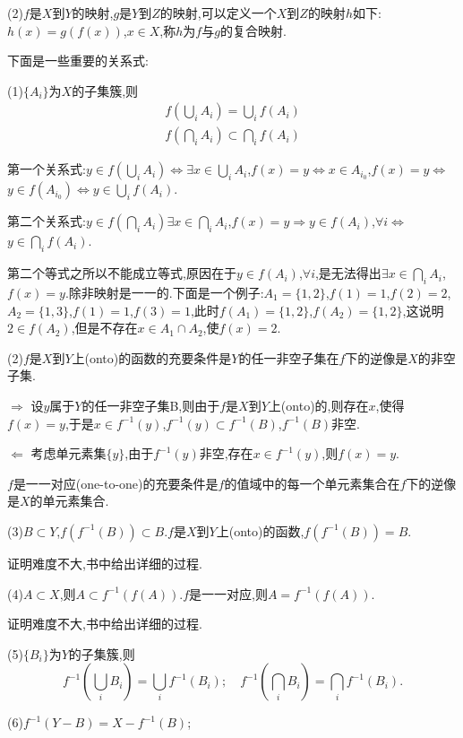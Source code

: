 \documentclass[12pt,a4paper,openany]{book}
\begin{document}
(2)$f$是$X$到$Y$的映射,$g$是$Y$到$Z$的映射,可以定义一个$X$到$Z$的映射$h$如下:$h(x)=g(f(x))$,$x \in X$,称$h$为$f$与$g$的复合映射.

下面是一些重要的关系式:

(1)$\{A_i\}$为$X$的子集簇,则
\begin{gather*}
f(\bigcup_{i}{A_i}) = \bigcup_{i}{f(A_i)} \\
f(\bigcap_{i}{A_i}) \subset \bigcap_{i}{f(A_i)}
\end{gather*}

第一个关系式:$y \in f(\bigcup_{i}{A_i})$$\Leftrightarrow$$\exists x \in \bigcup_{i}{A_i}$,$f(x)=y$$\Leftrightarrow$$x \in A_{i_0}$,$f(x)=y$$\Leftrightarrow$$y \in f(A_{i_0})$$\Leftrightarrow$$y \in \bigcup_{i}{f(A_i)}$.

第二个关系式:$y \in f(\bigcap_{i}{A_i})$$\exists x \in \bigcap_{i}{A_i}$,$f(x)=y$$\Rightarrow$$y \in f(A_i)$,$\forall i$$\Leftrightarrow$$y \in \bigcap_{i}{f(A_i)}$.

第二个等式之所以不能成立等式,原因在于$y \in f(A_i)$,$\forall i$,是无法得出$\exists x \in \bigcap_{i}{A_i}$,$f(x)=y$.除非映射是一一的.下面是一个例子:$A_1=\{1,2\}$,$f(1)=1$,$f(2)=2$,$A_2=\{1,3\}$,$f(1)=1$,$f(3)=1$,此时$f(A_1)=\{1,2\}$,$f(A_2)=\{1,2\}$,这说明$2 \in f(A_2)$,但是不存在$x \in A_1 \cap A_2$,使$f(x)=2$.

(2)$f$是$X$到$Y$上(onto)的函数的充要条件是$Y$的任一非空子集在$f$下的逆像是$X$的非空子集.

$\Rightarrow$ 设$y$属于$Y$的任一非空子集B,则由于$f$是$X$到$Y$上(onto)的,则存在$x$,使得$f(x)=y$,于是$x \in f^{-1}(y)$,$f^{-1}(y) \subset f^{-1}(B)$,$f^{-1}(B)$非空.

$\Leftarrow$ 考虑单元素集$\{y\}$,由于$f^{-1}(y)$非空,存在$x \in f^{-1}(y)$,则$f(x)=y$.

$f$是一一对应(one-to-one)的充要条件是$f$的值域中的每一个单元素集合在$f$下的逆像是$X$的单元素集合.

(3)$B \subset Y$,$f(f^{-1}(B)) \subset B$.$f$是$X$到$Y$上(onto)的函数,$f(f^{-1}(B))=B$.

证明难度不大,书中给出详细的过程.

(4)$A \subset X$,则$A \subset f^{-1}(f(A))$.$f$是一一对应,则$A = f^{-1}(f(A))$.

证明难度不大,书中给出详细的过程.

(5)$\{B_i\}$为$Y$的子集簇,则
\[
f^{-1}(\bigcup_{i}{B_i}) = \bigcup_{i}{f^{-1}(B_i)};\quad f^{-1}(\bigcap_{i}{B_i}) = \bigcap_{i}{f^{-1}(B_i)}.
\]

(6)$f^{-1}(Y-B) = X - f^{-1}(B)$;
\end{document}
